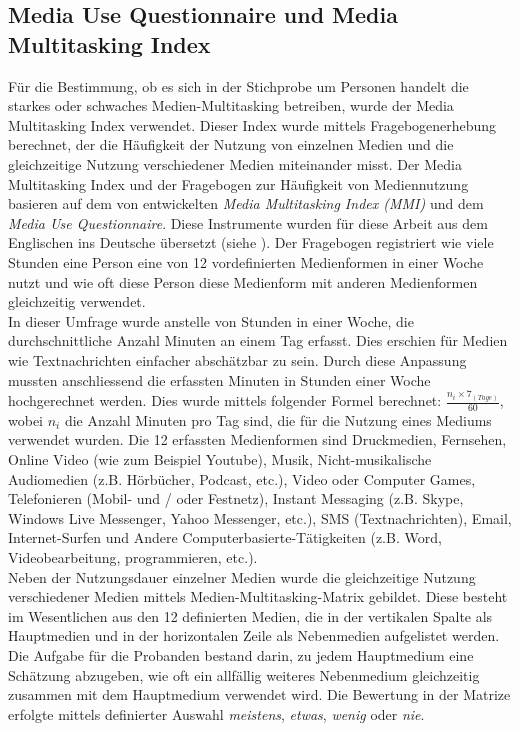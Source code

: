 \subsection{Media Use Questionnaire und Media Multitasking Index}\label{subsection.muq}
Für die Bestimmung, ob es sich in der Stichprobe um Personen handelt die starkes oder schwaches Medien-Multitasking betreiben, wurde der Media Multitasking Index verwendet. Dieser Index wurde mittels Fragebogenerhebung berechnet, der die Häufigkeit der Nutzung von einzelnen Medien und die gleichzeitige Nutzung verschiedener Medien miteinander misst. Der Media Multitasking Index und der Fragebogen zur Häufigkeit von Mediennutzung basieren auf dem von  entwickelten \textit{Media Multitasking Index (MMI)} und dem \textit{Media Use Questionnaire}. Diese Instrumente wurden für diese Arbeit aus dem Englischen ins Deutsche übersetzt (siehe ). Der Fragebogen registriert wie viele Stunden eine Person eine von 12 vordefinierten Medienformen in einer Woche nutzt und wie oft diese Person diese Medienform mit anderen Medienformen gleichzeitig verwendet. \\ 
In dieser Umfrage wurde anstelle von Stunden in einer Woche, die durchschnittliche Anzahl Minuten an einem Tag erfasst. Dies erschien für Medien wie Textnachrichten einfacher abschätzbar zu sein. Durch diese Anpassung mussten anschliessend die erfassten Minuten in Stunden einer Woche hochgerechnet werden. Dies wurde mittels folgender Formel berechnet: \(\frac{n_{i} \times 7_{(Tage)}}{60}\), wobei \(n_{i}\) die Anzahl Minuten pro Tag sind, die für die Nutzung eines Mediums verwendet wurden. Die 12 erfassten Medienformen sind Druckmedien, Fernsehen, Online Video (wie zum Beispiel Youtube), Musik, Nicht-musikalische Audiomedien (z.B. Hörbücher, Podcast, etc.), Video oder Computer Games, Telefonieren (Mobil- und / oder Festnetz), Instant Messaging (z.B. Skype, Windows Live Messenger, Yahoo Messenger, etc.), SMS (Textnachrichten), Email, Internet-Surfen und Andere Computerbasierte-Tätigkeiten (z.B. Word, Videobearbeitung, programmieren, etc.). \\
Neben der Nutzungsdauer einzelner Medien wurde die gleichzeitige Nutzung verschiedener Medien mittels Medien-Multitasking-Matrix gebildet. Diese besteht im Wesentlichen aus den 12 definierten Medien, die in der vertikalen Spalte als Hauptmedien und in der horizontalen Zeile als Nebenmedien aufgelistet werden. Die Aufgabe für die Probanden bestand darin, zu jedem Hauptmedium eine Schätzung abzugeben, wie oft ein allfällig weiteres Nebenmedium gleichzeitig zusammen mit dem Hauptmedium verwendet wird. Die Bewertung in der Matrize erfolgte mittels definierter Auswahl \textit{meistens}, \textit{etwas}, \textit{wenig} oder \textit{nie}.\\
